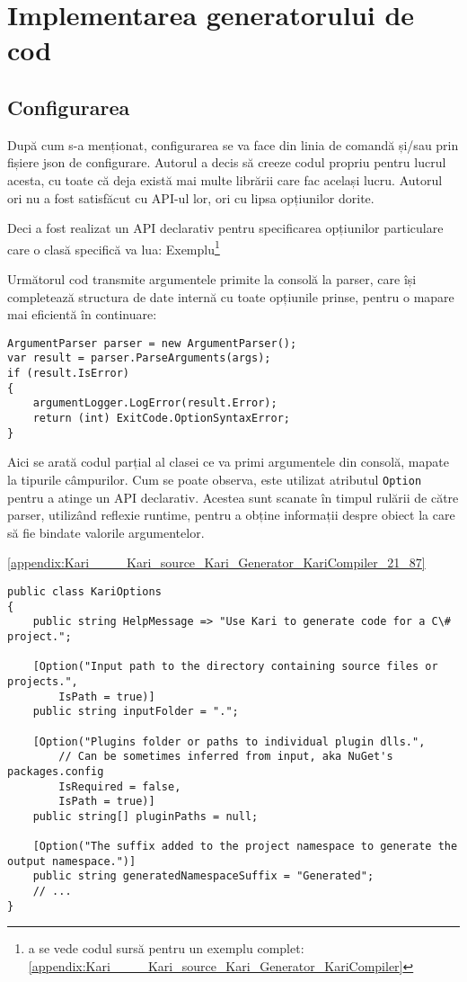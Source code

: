 \documentclass[a4paper,12pt]{report}
\begin{document}
\chapter{Implementarea generatorului de cod}

\section{Configurarea}

După cum s-a menționat, configurarea se va face din linia de comandă și/sau prin fișiere json de configurare.
Autorul a decis să creeze codul propriu pentru lucrul acesta, cu toate că deja există mai multe librării care fac același lucru.
Autorul ori nu a fost satisfăcut cu API-ul lor, ori cu lipsa opțiunilor dorite.

Deci a fost realizat un API declarativ pentru specificarea opțiunilor particulare care o clasă specifică va lua:
Exemplu\footnote{a se vede codul sursă pentru un exemplu complet:
\ref{appendix:Kari____Kari_source_Kari_Generator_KariCompiler}
}

Următorul cod transmite argumentele primite la consolă la parser, care își completează structura de date internă cu toate opțiunile prinse, pentru o mapare mai eficientă în continuare:




\begin{lstlisting}
ArgumentParser parser = new ArgumentParser();
var result = parser.ParseArguments(args);
if (result.IsError)
{
    argumentLogger.LogError(result.Error);
    return (int) ExitCode.OptionSyntaxError;
}
\end{lstlisting}

Aici se arată codul parțial al clasei ce va primi argumentele din consolă, mapate la tipurile câmpurilor.
Cum se poate observa, este utilizat atributul \texttt{Option} pentru a atinge un API declarativ.
Acestea sunt scanate în timpul rulării de către parser, utilizând reflexie runtime, pentru a obține informații despre obiect la care să fie bindate valorile argumentelor. 

\ref{appendix:Kari____Kari_source_Kari_Generator_KariCompiler_21_87}

\begin{lstlisting}
public class KariOptions
{
    public string HelpMessage => "Use Kari to generate code for a C\# project.";

    [Option("Input path to the directory containing source files or projects.", 
        IsPath = true)] 
    public string inputFolder = ".";

    [Option("Plugins folder or paths to individual plugin dlls.",
        // Can be sometimes inferred from input, aka NuGet's packages.config
        IsRequired = false,
        IsPath = true)]
    public string[] pluginPaths = null;

    [Option("The suffix added to the project namespace to generate the output namespace.")]
    public string generatedNamespaceSuffix = "Generated";
    // ...
}
\end{lstlisting}
\end{document}
